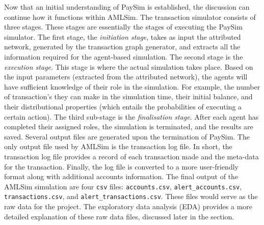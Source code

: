 Now that an initial understanding of PaySim is established, the discussion can continue how it functions within AMLSim. The transaction simulator consists of three stages. These stages are essentially the stages of executing the PaySim simulator. The first stage, the \textit{initiation stage}, takes as input the attributed network, generated by the transaction graph generator, and extracts all the information required for the agent-based simulation. The second stage is the \textit{execution stage}. This stage is where the actual simulation takes place. Based on the input parameters (extracted from the attributed network), the agents will have sufficient knowledge of their role in the simulation. For example, the number of transaction's they can make in the simulation time, their initial balance, and their distributional properties (which entails the probabilities of executing a certain action). The third sub-stage is the \textit{finalisation stage}. After each agent has completed their assigned roles, the simulation is terminated, and the results are saved. Several output files are generated upon the termination of PaySim. The only output file used by AMLSim is the transaction log file. In short, the transaction log file provides a record of each transaction made and the meta-data for the transaction. Finally, the log file is converted to a more user-friendly format along with additional accounts information. The final output of the AMLSim simulation are four \texttt{csv} files: \texttt{accounts.csv}, \texttt{alert\_accounts.csv}, \texttt{transactions.csv}, and \texttt{alert\_transactions.csv}. These files would serve as the raw data for the project. The exploratory data analysis (EDA) provides a more detailed explanation of these raw data files, discussed later in the section. 

